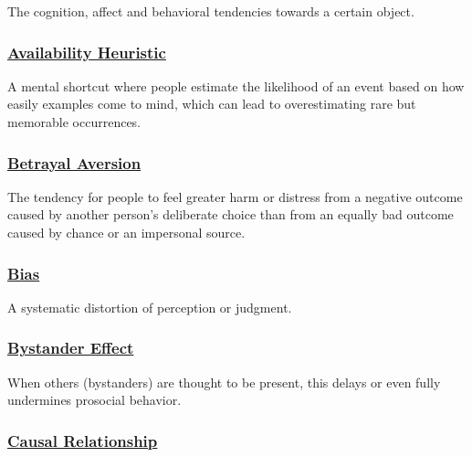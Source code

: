 \documentclass[
  letterpaper,
]{book}
\begin{document}
The cognition, affect and behavioral tendencies towards a certain
object.

\subsubsection*{\texorpdfstring{\hyperref[def-availabilityheuristic]{Availability
Heuristic}}{Availability Heuristic}}\label{availability-heuristic}

A mental shortcut where people estimate the likelihood of an event based
on how easily examples come to mind, which can lead to overestimating
rare but memorable occurrences.

\subsubsection*{\texorpdfstring{\hyperref[def-betrayalaversion]{Betrayal
Aversion}}{Betrayal Aversion}}\label{betrayal-aversion}

The tendency for people to feel greater harm or distress from a negative
outcome caused by another person's deliberate choice than from an
equally bad outcome caused by chance or an impersonal source.

\subsubsection*{\texorpdfstring{\hyperref[def-bias]{Bias}}{Bias}}\label{bias}

A systematic distortion of perception or judgment.

\subsubsection*{\texorpdfstring{\hyperref[def-bystandereffect]{Bystander
Effect}}{Bystander Effect}}\label{bystander-effect-1}

When others (bystanders) are thought to be present, this delays or even
fully undermines prosocial behavior.

\subsubsection*{\texorpdfstring{\hyperref[def-causal]{Causal
Relationship}}{Causal Relationship}}\label{causal-relationship}
\end{document}
